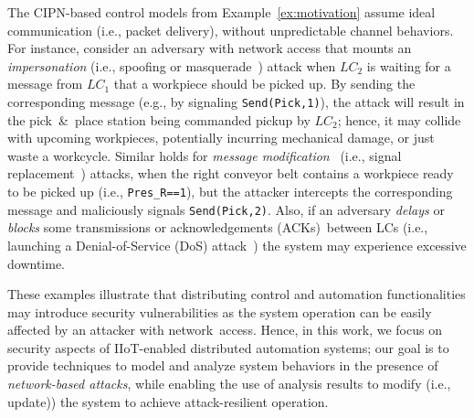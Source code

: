 The CIPN-based control models from Example~\ref{ex:motivation} assume ideal communication (i.e., packet delivery), without unpredictable %
channel behaviors. For instance, consider an adversary with network access that mounts an \emph{impersonation} (i.e., spoofing or masquerade~\cite{wirelessattack}) attack %
when $LC_2$ is waiting for a message from $LC_1$ %
that a workpiece should be picked up. By sending %
the corresponding message (e.g., by signaling \verb!Send(Pick,1)!), the attack will result in the pick~\&~place station  being commanded pickup by $LC_2$; hence, it may collide with upcoming workpieces, potentially incurring mechanical damage, or just waste a workcycle. Similar %
 holds for \emph{message modification}~\cite{wirelessattack} (i.e., signal replacement~\cite{DESsupervisoryControl}) attacks,
 when the right conveyor belt contains a workpiece ready to be picked up (i.e., \verb!Pres_R==1!), %
 but the attacker intercepts the corresponding message and maliciously signals \verb!Send(Pick,2)!. %
Also, if an adversary \emph{delays} or \emph{blocks} some transmissions or acknowledgements (ACKs)~between LCs (i.e., launching a Denial-of-Service (DoS) attack~\cite{wirelessattack}) %
the system may experience excessive downtime.

These examples illustrate that distributing control and automation functionalities may introduce security vulnerabilities as the system operation can be easily affected by an attacker with network~access.
Hence, in this work, we focus on security aspects of %
IIoT-enabled distributed automation systems; our goal is to provide techniques to model and analyze system behaviors in the presence of  \emph{network-based attacks}, while enabling the use of analysis results %
to modify (i.e., update)) the system to achieve attack-resilient operation.

